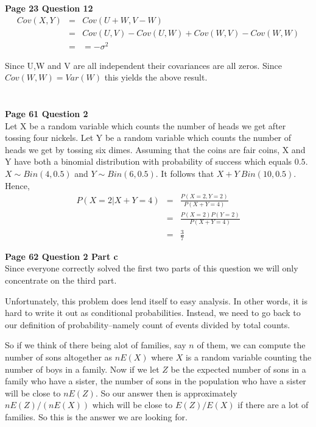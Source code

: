 \documentclass[10pt,a4paper]{article}
\begin{document}
\begin{flushleft}


\textbf{Page 23 Question 12}
\begin{eqnarray*}
Cov(X,Y) &=& Cov(U+W,V-W) \\
&=& Cov(U,V)-Cov(U,W)+Cov(W,V)-Cov(W,W)\\
&=&=-\sigma^2
\end{eqnarray*}

Since U,W and V are all independent their covariances are all
zeros. Since $ Cov(W,W)=Var(W)$ this yields the above result.

\begin{eqnarray*}
\\
\end{eqnarray*}

\textbf{Page 61 Question 2}\\
 Let X be a random variable which counts the number of heads we get after tossing
 four nickels.
 Let Y be a random variable which counts the number of heads we
 get by tossing six dimes.
 Assuming that the coins are fair coins, X and Y have both a
 binomial distribution with probability of success which equals
 $0.5$. $X\sim Bin(4,0.5)$ and $Y\sim Bin(6,0.5)$.  It follows
 that $X+Y~Bin(10,0.5)$. Hence,
 \begin{eqnarray*}
P(X=2|X+Y=4)&=&\frac{P(X=2,Y=2)}{P(X+Y=4)}\\
&=& \frac{P(X=2)P(Y=2)}{P(X+Y=4)}\\
&=& \frac{3}{7}
 \end{eqnarray*}

\newpage
\textbf{Page 62 Question 2 Part c}\\
Since everyone correctly solved the first two parts of this
question we will only concentrate on the third part.

Unfortunately, this problem does lend itself to easy analysis.  In
other words, it is hard to write it out as conditional probabilities.
Instead, we need to go back to our definition of probability--namely
count of events divided by total counts.

So if we think of there being alot of families, say $n$ of them, we
 can compute the number of sons altogether as $n E(X)$ where $X$ is a
 random variable counting the number of boys in a family.  Now if we
let $Z$ be the expected number of sons in a family who have a sister,
the number of sons in the population who have a sister will be close
to $n E(Z)$.  So our answer then is approximately $n E(Z)/(n E(X))$
which will be close to $E(Z)/E(X)$ if there are a lot of families.  So
this is the answer we are looking for.


\end{flushleft}
\end{document}
